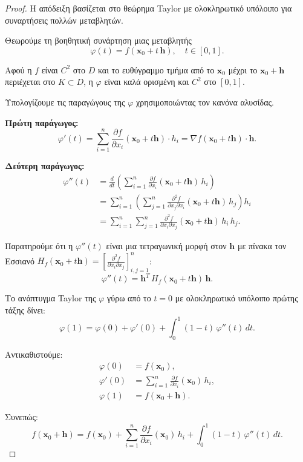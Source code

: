 \documentclass[10pt,a4paper,twoside,openany]{book}
\theoremstyle{plain}
\theoremstyle{definition}
\theoremstyle{remark}
\numberwithin{equation}{section}
\begin{document}
\begin{proof}
Η απόδειξη βασίζεται στο θεώρημα Taylor με ολοκληρωτικό υπόλοιπο για συναρτήσεις πολλών μεταβλητών.

Θεωρούμε τη βοηθητική συνάρτηση μιας μεταβλητής
\[
\varphi(t) = f(\mathbf{x}_0 + t\,\mathbf{h}), \quad t \in [0,1].
\]

Αφού η \(f\) είναι \(C^2\) στο \(D\) και το ευθύγραμμο τμήμα από το \(\mathbf{x}_0\) μέχρι το \(\mathbf{x}_0 + \mathbf{h}\) περιέχεται στο \(K \subset D\), η \(\varphi\) είναι καλά ορισμένη και \(C^2\) στο \([0,1]\).

Υπολογίζουμε τις παραγώγους της \(\varphi\) χρησιμοποιώντας τον κανόνα αλυσίδας.

\textbf{Πρώτη παράγωγος:}
\[
\varphi'(t) = \sum_{i=1}^n \frac{\partial f}{\partial x_i}(\mathbf{x}_0 + t\mathbf{h}) \cdot h_i = \nabla f(\mathbf{x}_0 + t\mathbf{h}) \cdot \mathbf{h}.
\]

\textbf{Δεύτερη παράγωγος:}
\begin{align*}
\varphi''(t) &= \frac{d}{dt} \left( \sum_{i=1}^n \frac{\partial f}{\partial x_i}(\mathbf{x}_0 + t\mathbf{h}) \, h_i \right) \\
&= \sum_{i=1}^n \left( \sum_{j=1}^n \frac{\partial^2 f}{\partial x_j \partial x_i}(\mathbf{x}_0 + t\mathbf{h}) \, h_j \right) h_i \\
&= \sum_{i=1}^n \sum_{j=1}^n \frac{\partial^2 f}{\partial x_i \partial x_j}(\mathbf{x}_0 + t\mathbf{h}) \, h_i \, h_j.
\end{align*}

Παρατηρούμε ότι η \(\varphi''(t)\) είναι μια τετραγωνική μορφή στον \(\mathbf{h}\) με πίνακα τον Εσσιανό \(H_f(\mathbf{x}_0 + t\mathbf{h}) = \left[ \frac{\partial^2 f}{\partial x_i \partial x_j} \right]_{i,j=1}^n\):
\[
\varphi''(t) = \mathbf{h}^T \, H_f(\mathbf{x}_0 + t\mathbf{h}) \, \mathbf{h}.
\]

Το ανάπτυγμα Taylor της \(\varphi\) γύρω από το \(t=0\) με ολοκληρωτικό υπόλοιπο πρώτης τάξης δίνει:
\[
\varphi(1) = \varphi(0) + \varphi'(0) + \int_0^1 (1-t) \, \varphi''(t) \, dt.
\]

Αντικαθιστούμε:
\begin{align*}
\varphi(0) &= f(\mathbf{x}_0), \\
\varphi'(0) &= \sum_{i=1}^n \frac{\partial f}{\partial x_i}(\mathbf{x}_0) \, h_i, \\
\varphi(1) &= f(\mathbf{x}_0 + \mathbf{h}).
\end{align*}

Συνεπώς:
\[
f(\mathbf{x}_0 + \mathbf{h}) = f(\mathbf{x}_0) + \sum_{i=1}^n \frac{\partial f}{\partial x_i}(\mathbf{x}_0) \, h_i + \int_0^1 (1-t) \, \varphi''(t) \, dt.
\]


\end{proof}
\end{document}
